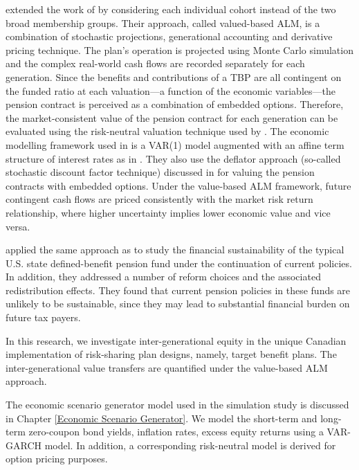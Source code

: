\documentclass{sfuthesis}
\numberwithin{equation}{chapter}
\begin{document}
	

		\justify
		\citet{Hoevenaars2008} extended the work of \citet{Kocken2006} by considering each individual cohort instead of the two broad membership groups. Their approach, called valued-based ALM, is a combination of stochastic projections, generational accounting and derivative pricing technique. The plan's operation is projected using Monte Carlo simulation and the complex real-world cash flows are recorded separately for each generation. Since the benefits and contributions of a TBP are all contingent on the funded ratio at each valuation---a function of the economic variables---the pension contract is perceived as a combination of embedded options. Therefore, the market-consistent value of the pension contract for each generation can be evaluated using the risk-neutral valuation technique used by \citet{Black1973}.  The economic modelling framework used in \citet{Hoevenaars2008} is a VAR(1) model augmented with an affine term structure of interest rates as in \citet{Cochrane2005}. They also use the deflator approach (so-called stochastic discount factor technique) discussed in \citet{DeJong2004} for valuing the pension contracts with embedded options. Under the value-based ALM framework, future contingent cash flows are priced consistently with the market risk return relationship, where higher uncertainty implies lower economic value and vice versa. 

	
	

		\justify
		\citet{Lekniute2014} applied the same approach as \citet{Hoevenaars2008} to study the financial sustainability of the typical U.S. state defined-benefit pension fund under the continuation of current policies. In addition, they addressed a number of reform choices and the associated redistribution effects. They found that current pension policies in these funds are unlikely to be sustainable, since they may lead to substantial financial burden on future tax payers.

	

		\justify
		In this research, we investigate inter-generational equity in the unique Canadian implementation of risk-sharing plan designs, namely, target benefit plans. The inter-generational value transfers are quantified under the value-based ALM approach. 

	
	
		\justify
		The economic scenario generator model used in the simulation study is discussed in Chapter \ref{Economic Scenario Generator}. We model the short-term and long-term zero-coupon bond yields, inflation rates, excess equity returns using a VAR-GARCH model. In addition, a corresponding risk-neutral model is derived for option pricing purposes.
	
\end{document}
